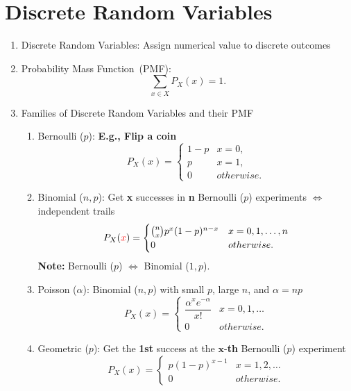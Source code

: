 \chapter{Discrete Random Variables}
\begin{enumerate}
    \item Discrete Random Variables: Assign numerical value to discrete outcomes
    \item Probability Mass Function~(PMF): \[\sum_{x\in X}P_X(x)=1.\] 
    \item Families of Discrete Random Variables and their PMF{
        \begin{enumerate}
            \item Bernoulli ($p$): \textbf{E.g., Flip a coin}{
                \[ P_X(x) = 
                \begin{cases}
                    1-p & x=0, \\
                    p   & x=1, \\
                    0   & otherwise.
                \end{cases} \]
            }
            \item Binomial ($n, p$): Get \textbf{x} successes in \textbf{n} Bernoulli ($p$) experiments $\iff$ independent trails{
                \[P_X(\textcolor{red}{x}) = {
                    \begin{cases}
                        \binom{n}{x}p^x(1-p)^{n-x} & x=0,1,\ldots,n \\ 
                        0 & otherwise.
                    \end{cases}
                }\]
                \textbf{Note:} Bernoulli ($p$) $\iff$ Binomial ($1, p$). 
            }
            \item Poisson ($\alpha$): Binomial ($n, p$) with small $p$, large $n$, and $\alpha=np${
                \[ P_X(x) = 
                \begin{cases}
                    \dfrac{\alpha^x e^{-\alpha}}{x!}   & x=0,1,\ldots \\
                    0   & otherwise.
                \end{cases} \]
            }
            \item Geometric ($p$): Get the \textbf{1st} success at the $\bm{x}$-\textbf{th} Bernoulli ($p$) experiment {
                \[ P_X(x) = 
                \begin{cases}
                    p(1-p)^{x-1} & x=1,2,\ldots \\
                    0   & otherwise.

\end{cases}\]}
\end{enumerate}}
\end{enumerate}
